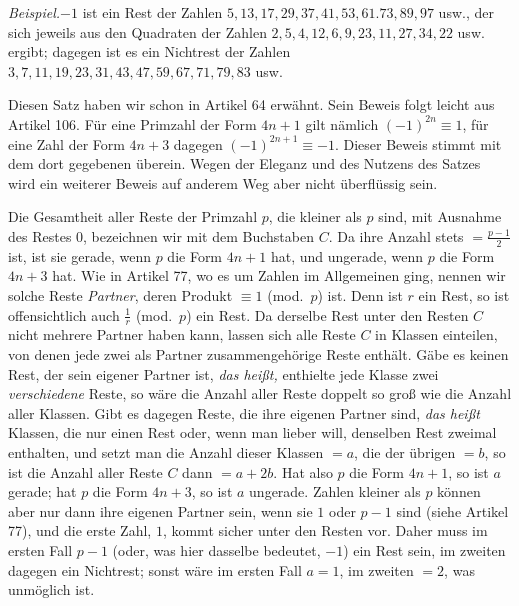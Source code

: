 \emph{Beispiel.}\quad $-1$ ist ein Rest der Zahlen $5,\allowbreak 13,\allowbreak 17,\allowbreak 29,\allowbreak 37,\allowbreak 41,\allowbreak 53,\allowbreak 61.73,\allowbreak 89,\allowbreak 97$ usw., der sich jeweils aus den Quadraten der Zahlen $2,\allowbreak 5,\allowbreak 4,\allowbreak 12,\allowbreak 6,\allowbreak 9,\allowbreak 23,\allowbreak 11,\allowbreak 27,\allowbreak 34,\allowbreak 22$ usw. ergibt; dagegen ist es ein Nichtrest der Zahlen $3,\allowbreak 7,\allowbreak 11,\allowbreak 19,\allowbreak 23,\allowbreak 31,\allowbreak 43,\allowbreak 47,\allowbreak 59,\allowbreak 67,\allowbreak 71,\allowbreak 79,\allowbreak 83$ usw.

Diesen Satz haben wir schon in Artikel 64 erwähnt. Sein Beweis folgt leicht aus Artikel 106. Für eine Primzahl der Form $4n+1$ gilt nämlich $(-1)^{2n}\equiv1$, für eine Zahl der Form $4n+3$ dagegen $(-1)^{2n+1}\equiv-1$. Dieser Beweis stimmt mit dem dort gegebenen überein. Wegen der Eleganz und des Nutzens des Satzes wird ein weiterer Beweis auf anderem Weg aber nicht überflüssig sein.

Die Gesamtheit aller Reste der Primzahl $p$, die kleiner als $p$ sind, mit Ausnahme des Restes $0$, bezeichnen wir mit dem Buchstaben $C$. Da ihre Anzahl stets $=\frac{p-1}{2}$ ist, ist sie gerade, wenn $p$ die Form $4n+1$ hat, und ungerade, wenn $p$ die Form $4n+3$ hat. Wie in Artikel 77, wo es um Zahlen im Allgemeinen ging, nennen wir solche Reste \emph{Partner}, deren Produkt $\equiv1$ (mod.~$p$) ist. Denn ist $r$ ein Rest, so ist offensichtlich auch $\frac{1}{r}$ (mod.~$p$) ein Rest. Da derselbe Rest unter den Resten $C$ nicht mehrere Partner haben kann, lassen sich alle Reste $C$ in Klassen einteilen, von denen jede zwei als Partner zusammengehörige Reste enthält. Gäbe es keinen Rest, der sein eigener Partner ist, \emph{das heißt,} enthielte jede Klasse zwei \emph{verschiedene} Reste, so wäre die Anzahl aller Reste doppelt so groß wie die Anzahl aller Klassen. Gibt es dagegen Reste, die ihre eigenen Partner sind, \emph{das heißt} Klassen, die nur einen Rest oder, wenn man lieber will, denselben Rest zweimal enthalten, und setzt man die Anzahl dieser Klassen $=a$, die der übrigen $=b$, so ist die Anzahl aller Reste $C$ dann $=a+2b$. Hat also $p$ die Form $4n+1$, so ist $a$ gerade; hat $p$ die Form $4n+3$, so ist $a$ ungerade. Zahlen kleiner als $p$ können aber nur dann ihre eigenen Partner sein, wenn sie $1$ oder $p-1$ sind (siehe Artikel 77), und die erste Zahl, $1$, kommt sicher unter den Resten vor. Daher muss im ersten Fall $p-1$ (oder, was hier dasselbe bedeutet, $-1$) ein Rest sein, im zweiten dagegen ein Nichtrest; sonst wäre im ersten Fall $a=1$, im zweiten $=2$, was unmöglich ist.

